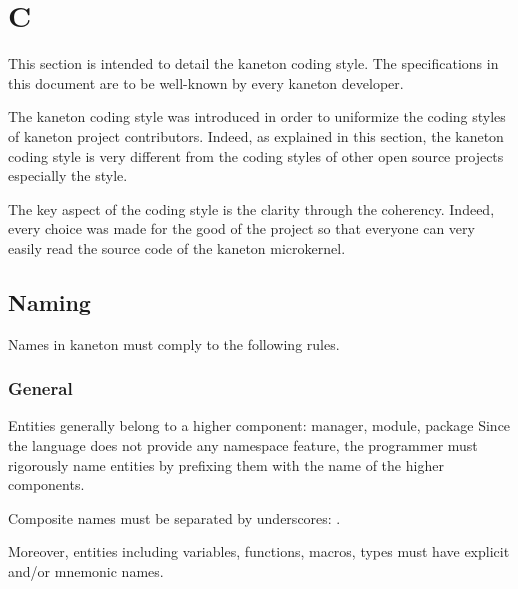 %
%
%
%
%
%

%
%

\section{C}
\label{section:c}

This section is intended to detail the kaneton  coding style.
The specifications in this document are to be well-known by every kaneton
developer.

The kaneton coding style was introduced in order to uniformize the 
coding styles of kaneton project contributors. Indeed, as explained in this
section, the kaneton coding style is very different from the coding styles
of other open source projects especially the  style.

The key aspect of the coding style is the clarity through the coherency.
Indeed, every choice was made for the good of the project so that everyone
can very easily read the source code of the kaneton microkernel.

%
%

\subsection{Naming}

Names in kaneton must comply to the following rules.


\subsubsection{General}

Entities generally belong to a higher component: manager, module, package
\etc{} Since the  language does not provide any namespace feature, the
programmer must rigorously name entities by prefixing them with the name
of the higher components.

Composite names must be separated by underscores: \code{\_}.

Moreover, entities including variables, functions, macros, types \etc{} must
have explicit and/or mnemonic names.


